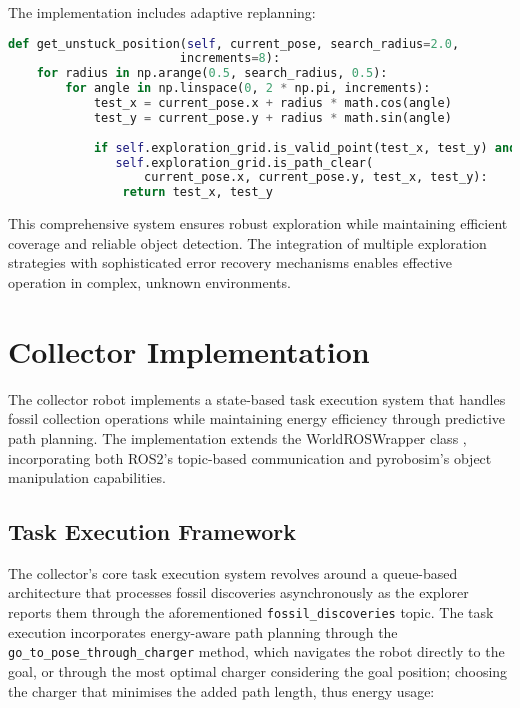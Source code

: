 \documentclass{csfourzero}
\begin{document}
The implementation includes adaptive replanning:

\begin{lstlisting}[language=Python]
def get_unstuck_position(self, current_pose, search_radius=2.0, 
                        increments=8):
    for radius in np.arange(0.5, search_radius, 0.5):
        for angle in np.linspace(0, 2 * np.pi, increments):
            test_x = current_pose.x + radius * math.cos(angle)
            test_y = current_pose.y + radius * math.sin(angle)
            
            if self.exploration_grid.is_valid_point(test_x, test_y) and 
               self.exploration_grid.is_path_clear(
                   current_pose.x, current_pose.y, test_x, test_y):
                return test_x, test_y
\end{lstlisting}

This comprehensive system ensures robust exploration while maintaining efficient coverage and reliable object detection. The integration of multiple exploration strategies with sophisticated error recovery mechanisms enables effective operation in complex, unknown environments.

\section{Collector Implementation}
The collector robot implements a state-based task execution system \cite{marder2010ros} that handles fossil collection operations while maintaining energy efficiency through predictive path planning. The implementation extends the WorldROSWrapper class \cite{pyrobosim-docs}, incorporating both ROS2's topic-based communication and pyrobosim's object manipulation capabilities.

\subsection{Task Execution Framework}
The collector's core task execution system revolves around a queue-based architecture that processes fossil discoveries asynchronously \cite{quigley2009ros} as the explorer reports them through the aforementioned \verb|fossil_discoveries| topic.
The task execution incorporates energy-aware path planning through the \verb|go_to_pose_through_charger| method, which navigates the robot directly to the goal, or through the most optimal charger considering the goal position; choosing the charger that minimises the added path length, thus energy usage:
\end{document}
